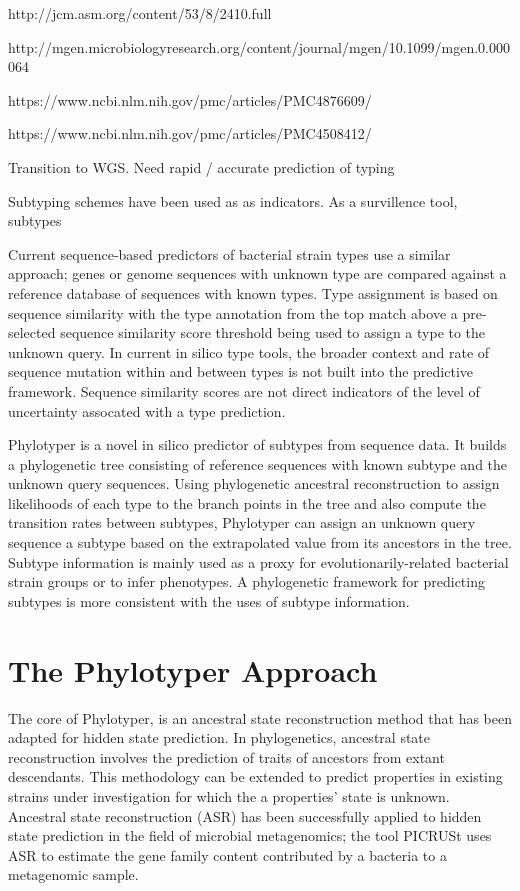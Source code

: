 \documentclass{bioinfo}
\begin{document}
http://jcm.asm.org/content/53/8/2410.full

http://mgen.microbiologyresearch.org/content/journal/mgen/10.1099/mgen.0.000064

https://www.ncbi.nlm.nih.gov/pmc/articles/PMC4876609/

https://www.ncbi.nlm.nih.gov/pmc/articles/PMC4508412/

Transition to WGS.  Need rapid / accurate prediction of typing

Subtyping schemes have been used as as indicators. As a survillence tool, subtypes 

Current sequence-based predictors of bacterial strain types use a similar approach; genes or genome sequences with unknown type are compared against a reference database of sequences with known types.
Type assignment is based on sequence similarity with the type annotation from the top match above a pre-selected sequence similarity score threshold being used to assign a type to the unknown query.
In current in silico type tools, the broader context and rate of sequence mutation within and between types is not built into the predictive framework.
Sequence similarity scores are not direct indicators of the level of uncertainty assocated with a type prediction.

Phylotyper is a novel in silico predictor of subtypes from sequence data. 
It builds a phylogenetic tree consisting of reference sequences with known subtype and the unknown query sequences.  
Using phylogenetic ancestral reconstruction to assign likelihoods of each type to the branch points in the tree and also compute the transition rates between subtypes, Phylotyper can assign an unknown query sequence a subtype based on the extrapolated value from its ancestors in the tree.
Subtype information is mainly used as a proxy for evolutionarily-related bacterial strain groups or to infer phenotypes.
A phylogenetic framework for predicting subtypes is more consistent with the uses of subtype information.


\section{The Phylotyper Approach}

The core of Phylotyper, is an ancestral state reconstruction method that has been adapted for hidden state prediction.
In phylogenetics, ancestral state reconstruction involves the prediction of traits of ancestors from extant descendants.
This methodology can be extended to predict properties in existing strains under investigation for which the a properties' state is unknown.
Ancestral state reconstruction (ASR) has been successfully applied to hidden state prediction in the field of microbial metagenomics; the tool PICRUSt uses ASR to estimate the gene family content contributed by a bacteria to a metagenomic sample.
\end{document}
